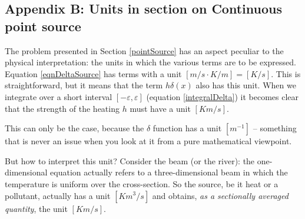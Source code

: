 \documentclass[onecolumn]{article}
\begin{document}
\subsection*{Appendix B: Units in section on Continuous point source}
\label{appUnits}
The problem presented in Section \ref{pointSource} has an aspect peculiar to the physical interpretation:
the units in which the various terms are to be expressed. Equation \ref{eqnDeltaSource} has terms with a
unit $[m/s \cdot K/m] = [K/s]$. This is straightforward, but it means that the term $h\delta(x)$ also
has this unit. When we integrate over a short interval $[-\varepsilon,\varepsilon]$ (equation \ref{integralDelta})
it becomes clear that the strength of the heating $h$ must have a unit $[Km/s]$.

This can only be the case, because the $\delta$ function has a unit $[m^{-1}]$ -- something that is never
an issue when you look at it from a pure mathematical viewpoint.

But how to interpret this unit? Consider the beam (or the river): the one-dimensional equation actually
refers to a three-dimensional beam in which the temperature is uniform over the cross-section. So the
source, be it heat or a pollutant, actually has a unit $[Km^3/s]$ and obtains, \emph{as a sectionally
averaged quantity}, the unit $[Km/s]$.



\end{document}

